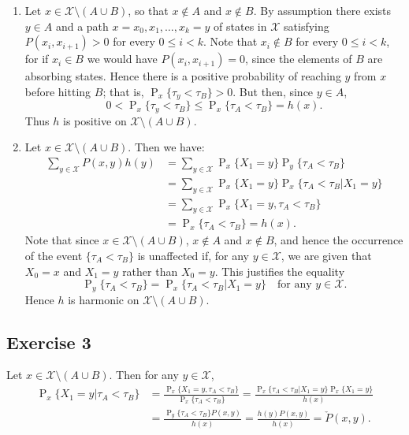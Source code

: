 \documentclass[12pt]{article}
\DeclareMathOperator{\Prob}{P}
\begin{document}
\begin{enumerate}[label=(\alph*)]
\item
Let $x \in \mathcal{X} \setminus (A \cup B)$, so that $x \not \in A$ and $x \not \in B$. By assumption there exists $y \in A$ and a path $x = x_0, x_1, \ldots, x_k = y$ of states in $\mathcal{X}$ satisfying $P(x_i, x_{i+1}) > 0$ for every $0 \leq i < k$. Note that $x_i \not \in B$ for every $0 \leq i < k$, for if $x_i \in B$ we would have $P(x_i, x_{i+1}) = 0$, since the elements of $B$ are absorbing states. Hence there is a positive probability of reaching $y$ from $x$ before hitting $B$; that is, $\Prob_x\{\tau_y < \tau_B\} > 0$. But then, since $y \in A$,
\begin{equation*}
0 < \Prob_x\{\tau_y < \tau_B\} \leq \Prob_x\{\tau_A < \tau_B\} = h(x).
\end{equation*}
Thus $h$ is positive on $\mathcal{X} \setminus (A \cup B)$.

\item
Let $x \in \mathcal{X} \setminus (A \cup B)$. Then we have:
\begin{align*}
\sum_{y \in \mathcal{X}} P(x, y) h(y) &= \sum_{y \in \mathcal{X}} \Prob_x\{X_1 = y\} \Prob_y\{\tau_A < \tau_B\} \\
&= \sum_{y \in \mathcal{X}} \Prob_x\{X_1 = y\} \Prob_x\{\tau_A < \tau_B | X_1 = y\} \\
&= \sum_{y \in \mathcal{X}} \Prob_x\{X_1 = y, \tau_A < \tau_B\} \\
&= \Prob_x\{\tau_A < \tau_B\} = h(x).
\end{align*}
Note that since $x \in \mathcal{X} \setminus (A \cup B)$, $x \not \in A$ and $x \not \in B$, and hence the occurrence of the event $\{\tau_A < \tau_B\}$ is unaffected if, for any $y \in \mathcal{X}$, we are given that $X_0 = x$ and $X_1 = y$ rather than $X_0 = y$. This justifies the equality
\begin{equation*}
\Prob_y\{\tau_A < \tau_B\} = \Prob_x\{\tau_A < \tau_B | X_1 = y\} \quad \text{for any $y \in \mathcal{X}$}.
\end{equation*}
Hence $h$ is harmonic on $\mathcal{X} \setminus (A \cup B)$.

\end{enumerate}

\subsection*{Exercise 3}

Let $x \in \mathcal{X} \setminus (A \cup B)$. Then for any $y \in \mathcal{X}$,
\begin{align*}
\Prob_x\{X_1 = y | \tau_A < \tau_B\} &= \frac{\Prob_x\{X_1 = y, \tau_A < \tau_B\}}{\Prob_x\{\tau_A < \tau_B\}} = \frac{\Prob_x\{\tau_A < \tau_B | X_1 = y\} \Prob_x\{X_1 = y\}}{h(x)} \\
&= \frac{\Prob_y\{\tau_A < \tau_B\} P(x, y)}{h(x)} = \frac{h(y) P(x, y)}{h(x)} = \check{P}(x, y).
\end{align*}
\end{document}
